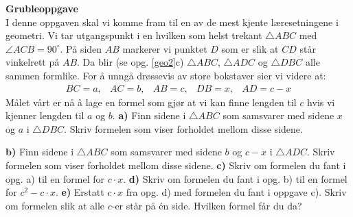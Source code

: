 \newpage
{\color{blue}\textbf{Grubleoppgave}}\\ \vspace{2pt}
I denne oppgaven skal vi komme fram til en av de mest kjente læresetningene i geometri.
Vi tar utgangspunkt i en hvilken som helst trekant $ \triangle ABC $ med $ {\angle ACB=90^\circ} $. På siden $ AB $ markerer vi punktet $ D $ som er slik at $ CD $ står vinkelrett på $ AB $. Da blir (se opg. \ref{geo2}c) $ \triangle ABC $, $ \triangle ADC$ og $ \triangle DBC $ alle sammen formlike. For å unngå drøssevis av store bokstaver sier vi videre at:
\[ \begin{matrix}
BC = a, & AC=b,& AB=c, & DB=x ,&  AD=c-x 
\end{matrix} \]
Målet vårt er nå å lage en formel som gjør at vi kan finne lengden til $ c $ hvis vi kjenner lengden til $ a $ og $ b $.\os
\textbf{a)} 
Finn sidene i $ \triangle ABC $ som samsvarer med sidene $ x $ og $ a $ i $ \triangle DBC $. Skriv formelen som viser forholdet mellom disse sidene.\os

\textbf{b)} Finn sidene i $ \triangle ABC $ som samsvarer med sidene $ b $ og $ {c-x} $ i $ \triangle ADC $. Skriv formelen som viser forholdet mellom disse sidene.\os
\textbf{c)} Skriv om formelen du fant i opg. a) til en formel for $ {c\cdot x} $.\os
\textbf{d)} Skriv om formelen du fant i opg. b) til en formel for $ {c^2-c\cdot x}  $.\os
\textbf{e)} Erstatt $ c\cdot x $ fra opg. d) med formelen du fant i oppgave c). Skriv om formelen slik at alle $ c $-er står på én side. Hvilken formel får du da?

